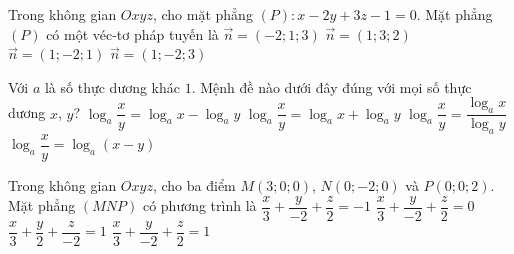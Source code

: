 \begin{ex}%
Trong không gian $Oxyz$, cho mặt phẳng $(P): x-2y+3z-1=0$. Mặt phẳng $(P)$ có một véc-tơ pháp tuyến là
\choice
{$\overrightarrow{n}=(-2;1;3)$}
{$\overrightarrow{n}=(1;3;2)$}
{$\overrightarrow{n}=(1;-2;1)$}
{\True $\overrightarrow{n}=(1;-2;3)$}
\end{ex}

\begin{ex}%
Với $a$ là số thực dương khác $1$. Mệnh đề nào dưới đây đúng với mọi số thực dương $x$, $y$?
\choice
{\True $\log_a\dfrac{x}{y}=\log_ax-\log_ay$}
{$\log_a\dfrac{x}{y}=\log_ax+\log_ay$}
{$\log_a\dfrac{x}{y}=\dfrac{\log_ax}{\log_ay}$}
{$\log_a\dfrac{x}{y}=\log_a(x-y)$}
\end{ex}

\begin{ex}%
Trong không gian $Oxyz$, cho ba điểm $M(3;0;0)$, $N(0;-2;0)$ và $P(0;0;2)$. Mặt phẳng $(MNP)$ có phương trình là
\choice
{$\dfrac{x}{3}+\dfrac{y}{-2}+\dfrac{z}{2}=-1$}
{$\dfrac{x}{3}+\dfrac{y}{-2}+\dfrac{z}{2}=0$}
{$\dfrac{x}{3}+\dfrac{y}{2}+\dfrac{z}{-2}=1$}
{\True $\dfrac{x}{3}+\dfrac{y}{-2}+\dfrac{z}{2}=1$}
\end{ex}

